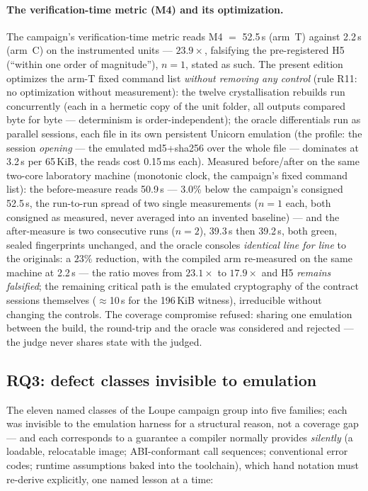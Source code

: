 \documentclass[11pt,a4paper]{article}
\begin{document}
\paragraph{The verification-time metric (M4) and its optimization.}
The campaign's verification-time metric reads M4 $=$ 52.5\,s (arm~T)
against 2.2\,s (arm~C) on the instrumented units --- $23.9\times$,
falsifying the pre-registered H5 (``within one order of magnitude''),
$n{=}1$, stated as such. The present edition optimizes the arm-T
fixed command list \emph{without removing any control} (rule R11: no
optimization without measurement): the twelve crystallisation rebuilds
run concurrently (each in a hermetic copy of the unit folder, all
outputs compared byte for byte --- determinism is order-independent);
the oracle differentials run as parallel sessions, each file in its own
persistent Unicorn emulation (the profile: the session \emph{opening}
--- the emulated md5+sha256 over the whole file --- dominates at
3.2\,s per 65\,KiB, the reads cost 0.15\,ms each). Measured
before/after on the same two-core laboratory machine (monotonic clock,
the campaign's fixed command list): the before-measure reads 50.9\,s
--- 3.0\% below the campaign's consigned 52.5\,s, the run-to-run
spread of two single measurements ($n{=}1$ each, both consigned as
measured, never averaged into an invented baseline) --- and the
after-measure is two consecutive runs ($n{=}2$), 39.3\,s then
39.2\,s, both green, sealed fingerprints unchanged, and the oracle
consoles \emph{identical line for line} to the originals: a $23\%$
reduction, with
the compiled arm re-measured on the same machine at 2.2\,s --- the
ratio moves from $23.1\times$ to $17.9\times$ and H5 \emph{remains
falsified}; the remaining critical path is the emulated cryptography of
the contract sessions themselves ($\approx$10\,s for the 196\,KiB
witness), irreducible without changing the controls. The coverage
compromise refused: sharing one emulation between the build, the
round-trip and the oracle was considered and rejected --- the judge
never shares state with the judged.

\subsection{RQ3: defect classes invisible to emulation}\label{sec:rq3}

The eleven named classes of the Loupe campaign group into five families;
each was invisible to the emulation harness for a structural reason, not
a coverage gap --- and each corresponds to a guarantee a compiler
normally provides \emph{silently} (a loadable, relocatable image;
ABI-conformant call sequences; conventional error codes; runtime
assumptions baked into the toolchain), which hand notation must
re-derive explicitly, one named lesson at a time:
\end{document}
